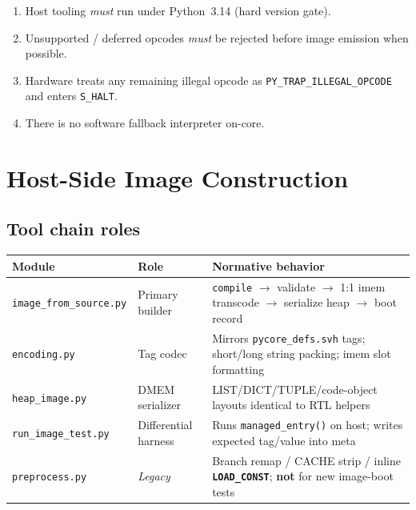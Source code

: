 \documentclass[11pt,a4paper]{article}
\newcommand{\opcode}[1]{\texttt{\textbf{#1}}}
\begin{document}
\begin{normbox}
\begin{enumerate}[leftmargin=*,itemsep=1pt]
  \item Host tooling \emph{must} run under Python~3.14 (hard version gate).
  \item Unsupported / deferred opcodes \emph{must} be rejected before image
        emission when possible.
  \item Hardware treats any remaining illegal opcode as
        \texttt{PY\_TRAP\_ILLEGAL\_OPCODE} and enters \texttt{S\_HALT}.
  \item There is no software fallback interpreter on-core.
\end{enumerate}
\end{normbox}

\section{Host-Side Image Construction}
\label{sec:host}

\subsection{Tool chain roles}

\begin{center}
\begin{tabular}{@{}llp{7.2cm}@{}}
\toprule
\textbf{Module} & \textbf{Role} & \textbf{Normative behavior} \\
\midrule
\texttt{image\_from\_source.py} & Primary builder &
  \texttt{compile} $\rightarrow$ validate $\rightarrow$ 1:1 imem transcode
  $\rightarrow$ serialize heap $\rightarrow$ boot record \\
\texttt{encoding.py} & Tag codec & Mirrors \texttt{pycore\_defs.svh} tags;
  short/long string packing; imem slot formatting \\
\texttt{heap\_image.py} & DMEM serializer & LIST/DICT/TUPLE/code-object layouts
  identical to RTL helpers \\
\texttt{run\_image\_test.py} & Differential harness & Runs
  \texttt{managed\_entry()} on host; writes expected tag/value into meta \\
\texttt{preprocess.py} & \emph{Legacy} & Branch remap / CACHE strip / inline
  \opcode{LOAD\_CONST}; \textbf{not} for new image-boot tests \\
\bottomrule
\end{tabular}
\end{center}
\end{document}

